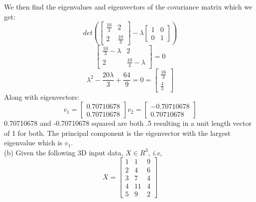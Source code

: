 \documentclass{article}
\begin{document}
We then find the eigenvalues and eigenvectors of the covariance matrix which we get:
\begin{equation*}
    det(
    \begin{bmatrix}
        \frac{10}{3} & 2 \\
        2 & \frac{10}{3}
    \end{bmatrix}
    - \lambda
    \begin{bmatrix}
        1 & 0 \\
        0 & 1
    \end{bmatrix}
    )
\end{equation*}
\begin{equation*}
    \begin{bmatrix}
        \frac{10}{3} - \lambda & 2 \\
        2 & \frac{10}{3} - \lambda
    \end{bmatrix} = 0
\end{equation*}
\begin{equation*}
    \lambda^2 - \frac{20\lambda}{3} + \frac{64}{9} = 0
    = \begin{bmatrix}
        \frac{16}{3} \\
        \frac{4}{3}
    \end{bmatrix}
\end{equation*}
Along with eigenvectors:
\begin{equation*}
    v_1 = 
    \begin{bmatrix}
        0.70710678 \\
        0.70710678 
    \end{bmatrix}
    v_2 =
    \begin{bmatrix}
        - 0.70710678 \\
        0.70710678 
    \end{bmatrix}
\end{equation*}
0.70710678 and -0.70710678 squared are both .5 resulting in a unit length vector of 1 for both. The principal component is the eigenvector with the largest eigenvalue which is $v_1$.
\\
(b) Given the following 3D input data, $X \in R^3$, \textit{i.e,}
\begin{equation*}
    X = \begin{bmatrix}
        1 & 1 & 9 \\
        2 & 4 & 6 \\
        3 & 7 & 4 \\
        4 & 11 & 4 \\
        5 & 9 & 2
    \end{bmatrix}
\end{equation*}
\end{document}
